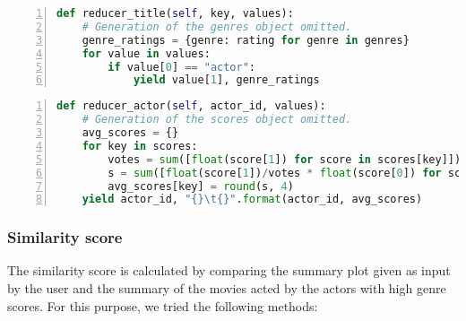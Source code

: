 \begin{lstlisting}[float=h!, language=Python, caption=Genre score first reducer, label=GenreScoreCode2, numbers=left]
def reducer_title(self, key, values):
    # Generation of the genres object omitted.
    genre_ratings = {genre: rating for genre in genres}
    for value in values:
        if value[0] == "actor":
            yield value[1], genre_ratings
\end{lstlisting}

\begin{lstlisting}[float=h!, language=Python, caption=Genre score final reducer, label=GenreScoreCode3, numbers=left]
def reducer_actor(self, actor_id, values):
    # Generation of the scores object omitted.
    avg_scores = {}
    for key in scores:
        votes = sum([float(score[1]) for score in scores[key]])
        s = sum([float(score[1])/votes * float(score[0]) for score in scores[key]])
        avg_scores[key] = round(s, 4)
    yield actor_id, "{}\t{}".format(actor_id, avg_scores)
\end{lstlisting}



\subsubsection{Similarity score}
The similarity score is calculated by comparing the summary plot given as input by the user and the summary of the movies acted by the actors with high genre scores. For this purpose, we tried the following methods:

